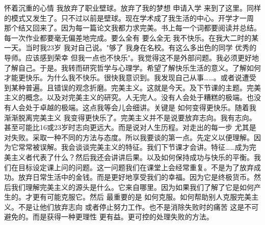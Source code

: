 怀着沉重的心情 我放弃了职业壁球。放弃了我的梦想 申请入学 来到了这里。同样的模式又发生了。只不过以前是壁球。现在学术成了我生活的中心。开学才一周 那个结又回来了。因为每一篇论文我都力求完美。书上每一个词都要阅读并总结。每一次作业都要毫无偏差地完成。要么全有 要么全无 我不快乐。在我大二时的某一天。当时我23岁 我对自己说。"够了 我身在名校。有这么多出色的同学 优秀的导师。应该感到荣幸 但我一点也不快乐"。我觉得这不是外部问题。我必须更好地了解自己。于是。我转而研究哲学与心理学。希望了解快乐生活的意义。了解如何才能更快乐。为什么我不快乐。很快我意识到。我发现自己从事……。或者说遭受到某种普遍。且错误的观念折磨。完美主义。这就是今天。及下节课的主题。完美主义的概念。以及对完美主义的研究。人无完人。没有人会处于糟糕的极端。也没有人会处于卓越的极端。这点我等会儿会细讲。关键是 如何变得更快乐。随着我渐渐脱离完美主义 我变得更快乐了。完美主义并不是说要放弃志向。我有志向。甚至可能比16或23岁时志向更远大。而是说对人生历程。对走出的每一步 尤其是对失败。采取一种不同的方法与态度。所以我要谈的第一点。先定义以便理解。因为它常常被误解。我会谈谈完美主义的特征。我们下节课才会讲。特征……成为完美主义者代表了什么？然后我还会讲讲后果。以及如何保持成功与快乐的平衡。我们在目标设定课上问的问题。这一问题我们在课堂上会经常重复。不是为了放弃成功。放弃日常生活中的金钱。而是更好地享受我们的幸福。因为它是终极货币。然后我们理解完美主义的源头是什么。它来自哪里。因为如果我们了解了它是如何产生的。才更有可能克服它。然后 最重要的是 如何克服。如何帮助别人克服完美主义。不是让他们放弃志向 或者停止努力工作。也不是消除失败时的痛苦 这是不可避免的。而是获得一种更理性 更有益。更可控的处理失败的方法。 

